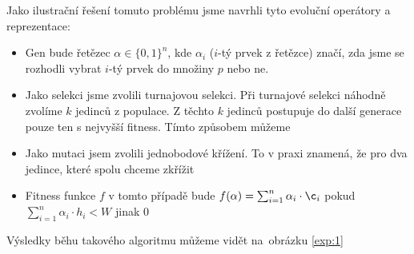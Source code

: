 Jako ilustrační řešení tomuto problému jsme navrhli tyto evoluční operátory a reprezentace:
\begin{itemize}
    \item Gen bude řetězec $\alpha \in \{0,1\}^n$, kde $\alpha_i$ ($i$-tý prvek z řetězce) značí, zda jsme se rozhodli vybrat $i$-tý prvek do množiny $p$ nebo ne.
    \item Jako selekci jsme zvolili turnajovou selekci. Při turnajové selekci náhodně zvolíme $k$ jedinců z populace. Z těchto $k$ jedinců postupuje do další generace pouze ten s nejvyšší fitness. Tímto způsobem můžeme
    \item Jako mutaci jsem zvolili jednobodové křížení. To v praxi znamená, že pro dva jedince, které spolu chceme zkřížit
    \item Fitness funkce $f$ v tomto případě bude $f(\alpha) = \sum_{i=1}^n \alpha_i \cdot \c_i$ pokud $\sum_{i=1}^n \alpha_i \cdot h_i < W$ jinak $0$
\end{itemize}

Výsledky běhu takového algoritmu můžeme vidět na~obrázku \ref{exp:1}

